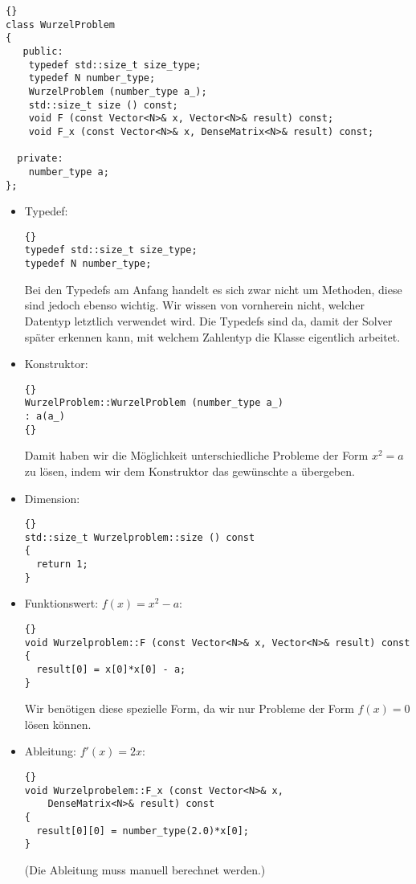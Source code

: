 \documentclass[a4paper,11pt]{article}
\theoremstyle{definition}
\begin{document}
{\footnotesize{\begin{lstlisting}{}
class WurzelProblem
{
   public:
    typedef std::size_t size_type;
    typedef N number_type;
    WurzelProblem (number_type a_);
    std::size_t size () const;
    void F (const Vector<N>& x, Vector<N>& result) const;
    void F_x (const Vector<N>& x, DenseMatrix<N>& result) const;

  private:
    number_type a;
};
\end{lstlisting}}}


\begin{itemize}
\item Typedef:

  {\footnotesize{\begin{lstlisting}{}
typedef std::size_t size_type;
typedef N number_type;
\end{lstlisting}}}

Bei den Typedefs am Anfang handelt es sich zwar nicht um Methoden,
diese sind jedoch ebenso wichtig. Wir wissen von vornherein nicht,
welcher Datentyp letztlich verwendet wird. Die Typedefs sind da, damit
der Solver später erkennen kann, mit welchem Zahlentyp die Klasse
eigentlich arbeitet.

\item Konstruktor:
  {\footnotesize{\begin{lstlisting}{}
WurzelProblem::WurzelProblem (number_type a_)
: a(a_)
{}
\end{lstlisting}}}

Damit haben wir die Möglichkeit unterschiedliche Probleme der Form
$x^2=a$ zu lösen, indem wir dem Konstruktor das gewünschte a
übergeben.

\item Dimension:

  {\footnotesize{\begin{lstlisting}{}
std::size_t Wurzelproblem::size () const
{
  return 1;
}
\end{lstlisting}}}

\item Funktionswert: $f(x)=x^2-a$:

  {\footnotesize{\begin{lstlisting}{}
void Wurzelproblem::F (const Vector<N>& x, Vector<N>& result) const
{
  result[0] = x[0]*x[0] - a;
}
\end{lstlisting}}}

Wir benötigen diese spezielle Form, da wir nur Probleme der Form
$f(x)=0$ lösen können.

\item Ableitung: $f'(x)=2x$:
  {\footnotesize{\begin{lstlisting}{}
void Wurzelprobelem::F_x (const Vector<N>& x,
    DenseMatrix<N>& result) const
{
  result[0][0] = number_type(2.0)*x[0];
}
\end{lstlisting}}}
(Die Ableitung muss manuell berechnet werden.)
\end{itemize}
\end{document}
